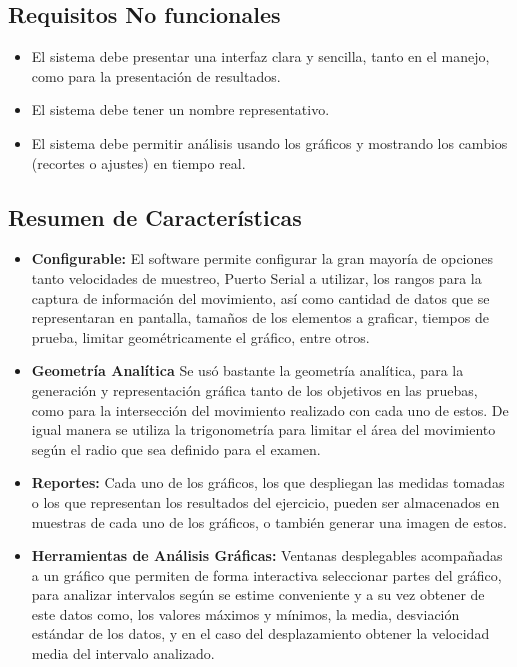 \documentclass[12pt,a4paper]{article}
\begin{document}
\subsection{Requisitos No funcionales}
\begin{itemize}
	\item El sistema debe presentar una interfaz clara y sencilla, tanto en el manejo, como para la presentación de resultados.
	\item El sistema debe tener un nombre representativo.
	\item El sistema debe permitir análisis usando los gráficos y mostrando los cambios (recortes o ajustes) en tiempo real.
\end{itemize}

\subsection{Resumen de Características}
\begin{itemize}
	\item \textbf{Configurable:} El software permite configurar la gran mayoría de opciones tanto velocidades de muestreo, Puerto Serial a utilizar, los rangos para la captura de información del movimiento, así como cantidad de datos que se representaran en pantalla, tamaños de los elementos a graficar, tiempos de prueba, limitar geométricamente el gráfico, entre otros.
	\item \textbf{Geometría Analítica} Se usó bastante la geometría analítica, para la generación y representación gráfica tanto de los objetivos en las pruebas, como para la intersección del movimiento realizado con cada uno de estos. De igual manera se utiliza la trigonometría para limitar el área del movimiento según el radio que sea definido para el examen.
	\item \textbf{Reportes:} Cada uno de los gráficos, los que despliegan las medidas tomadas o los que representan los resultados del ejercicio, pueden ser almacenados en muestras de cada uno de los gráficos, o también generar una imagen de estos.
	\item \textbf{Herramientas de Análisis Gráficas:} Ventanas desplegables acompañadas a un gráfico que permiten de forma interactiva seleccionar partes del gráfico, para analizar intervalos según se estime conveniente y a su vez obtener de este datos como, los valores máximos y mínimos, la media, desviación estándar de los datos, y en el caso del desplazamiento obtener la velocidad media del intervalo analizado.
\end{itemize}
\end{document}
